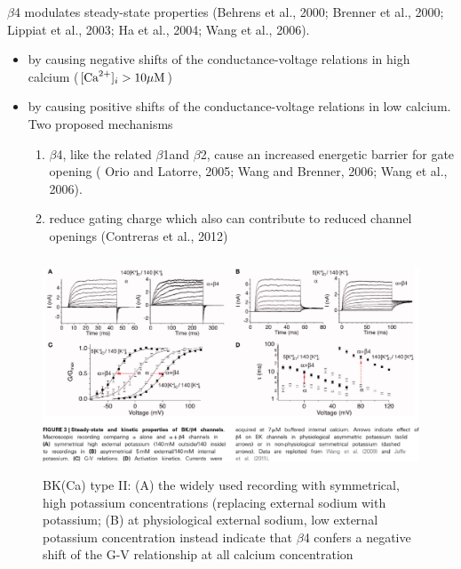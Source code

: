 $\beta$4 modulates steady-state properties  (Behrens et al., 2000; Brenner et al.,
2000; Lippiat et al., 2003; Ha et al., 2004; Wang et al., 2006).
\begin{itemize}
  \item  by causing negative shifts of the conductance-voltage relations in high
  calcium ($[{\text{Ca}^{2+}}]_i > 10 {\mu\text{M}}$)
  
  \item by causing positive shifts of the conductance-voltage relations in low
  calcium. Two proposed mechanisms
  \begin{enumerate}
    
    \item  $\beta$4, like the related $\beta$1and $\beta$2, cause an increased
    energetic barrier for gate opening ( Orio and Latorre, 2005; Wang and
    Brenner, 2006; Wang et al., 2006).
    
    \item reduce gating charge which also can contribute to reduced channel
    openings (Contreras et al., 2012)

  \end{enumerate}
\end{itemize}

\begin{figure}[hbt]
  \centerline{\includegraphics[height=6.4cm,
    angle=0]{./images/BK(Ca)-type-II.eps}}
\caption{BK(Ca) type II: (A) the widely used recording with symmetrical, high
potassium concentrations (replacing external sodium with potassium; 
(B)  at physiological external sodium, low external potassium
concentration instead indicate that $\beta$4 confers a negative shift of
the G-V relationship at all calcium concentration}
\label{fig:BK(Ca)-type-II}
\end{figure}


